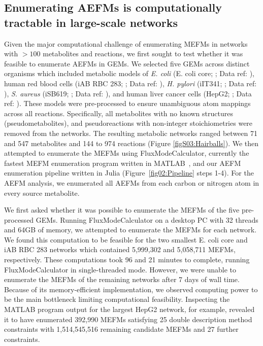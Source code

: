\documentclass[12pt]{article}
\begin{document}
\subsection*{Enumerating AEFMs is computationally tractable in large-scale networks}

Given the major computational challenge of enumerating MEFMs in
networks with $>100$ metabolites and reactions, we first sought to test
whether it was feasible to enumerate AEFMs in GEMs. We selected five GEMs
across distinct organisms which included metabolic models of \textit{E.
coli} (E. coli core; \citealt{OrthJeffreyD2010RaUo}; Data ref:
\citealt{OrthJeffreyD2010RaUoDATASET}), human red blood cells (iAB RBC
283; \citealt{BordbarAarash2011iApd}; Data ref:
\citealt{BordbarAarash2011iApdDATASET}), \textit{H. pylori} (iIT341;
\citealt{ThieleInes2005EMRo}; Data ref:
\citealt{ThieleInes2005EMRoDATASET}), \textit{S. aureus} (iSB619;
\citealt{BeckerScottA2005Grot}; Data ref:
\citealt{BeckerScottA2005GrotDATASET}), and human liver cancer cells
(HepG2; \citealt{NilssonAvlant2020Qaoa}; Data ref:
\citealt{NilssonAvlant2020QaoaDATASET}). These models were pre-processed
to ensure unambiguous atom mappings across all reactions. Specifically,
all metabolites with no known structures (pseudometabolites), and
pseudoreactions with non-integer stoichiometries were removed from the
networks. The resulting metabolic networks ranged between 71 and 547
metabolites and 144 to 974 reactions (Figure \ref{figS03:Hairballs}). We
then attempted to enumerate the MEFMs using FluxModeCalculator, currently
the fastest MEFM enumeration program written in
MATLAB~\citep{vanKlinkenJanBert2016Faet}, and our AEFM enumeration
pipeline written in Julia (Figure~\ref{fig02:Pipeline} steps 1-4). For the
AEFM analysis, we enumerated all AEFMs from each carbon or nitrogen atom
in every source metabolite. 

We first asked whether it was possible to enumerate the MEFMs of the five
pre-processed GEMs. Running FluxModeCalculator on a desktop PC with 32
threads and 64GB of memory, we attempted to enumerate the MEFMs for each
network. We found this computation to be feasible for the two smallest E.
coli core and iAB RBC 283 networks which contained 5,999,302 and 5,058,711
MEFMs, respectively. These computations took 96 and 21 minutes to
complete, running FluxModeCalculator in single-threaded mode. However, we
were unable to enumerate the MEFMs of the remaining networks after 7 days
of wall time. Because of its memory-efficient implementation, we observed
computing power to be the main bottleneck limiting computational
feasibility. Inspecting the MATLAB program output for the largest HepG2
network, for example, revealed it to have enumerated 392,990 MEFMs
satisfying 25 double description method constraints with 1,514,545,516
remaining candidate MEFMs and 27 further constraints.
   
\end{document}
